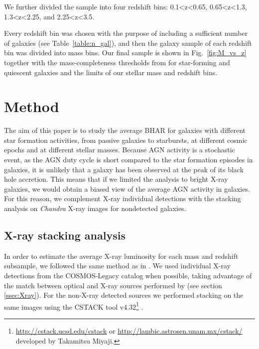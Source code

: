 We further divided the sample into four redshift bins: 0.1<z<0.65, 0.65<z<1.3, 1.3<z<2.25, and 2.25<z<3.5.

Every redshift bin was chosen with the purpose of including a sufficient number of galaxies (see Table~\ref{table:n_gal}), and then the galaxy sample of each redshift bin was divided into mass bins. Our final sample is shown in Fig.~\ref{fig:M_vs_z} together with the mass-completeness thresholds from \citet{2016ApJS..224...24L} for star-forming and quiescent galaxies and the limits of our stellar mass and redshift bins. 

\section{Method} \label{sec:method}
The aim of this paper is to study the average BHAR for galaxies with different star formation activities, from passive galaxies to starbursts, at different cosmic epochs and at different stellar masses. Because AGN activity is a stochastic event, as the AGN duty cycle is short compared to the star formation episodes in galaxies, it is unlikely that a galaxy has been observed at the peak of its black hole accretion. This means that if we limited the analysis to bright X-ray galaxies, we would obtain a biased view of the average AGN activity in
galaxies. For this reason, we complement X-ray individual detections with the stacking analysis on \textit{Chandra} X-ray images for nondetected galaxies. 

\subsection{X-ray stacking analysis} \label{sec:stacking}
In order to estimate the average X-ray luminosity for each mass and redshift subsample, we followed the same method as in \citet{2015ApJ...800L..10R}. We used individual X-ray detections from the COSMOS-Legacy catalog \citep{2016ApJ...819...62C} when possible, taking advantage of the match between optical and X-ray sources performed by \citet{2016ApJ...817...34M} (see section \ref{ssec:Xray}). For the non-X-ray detected sources we performed stacking on the same images using the CSTACK tool v4.32\footnote{\url{http://cstack.ucsd.edu/cstack} or \url{http://lambic.astrosen.unam.mx/cstack/} developed by Takamitsu Miyaji.}  \citep{2008HEAD...10.0401M}.

